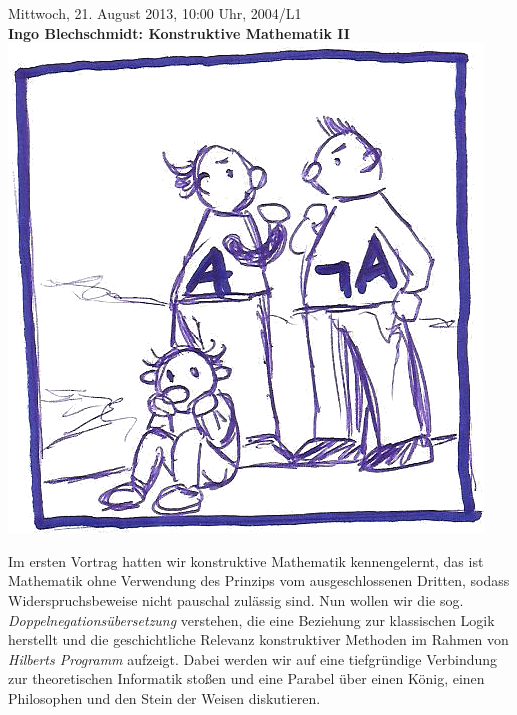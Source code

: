 \documentclass[a4paper,ngerman,landscape]{scrartcl}
\begin{document}
\begin{center}
  \Huge
  Mittwoch, 21. August 2013, 10:00 Uhr, 2004/L1 \\
  \textbf{Ingo Blechschmidt: Konstruktive Mathematik II}
  \vfill
  \includegraphics[scale=1.6]{lem}
  \vfill

  \Large
  \begin{minipage}{0.91\textwidth}
    \setlength\parskip{\medskipamount}
    Im ersten Vortrag hatten wir konstruktive Mathematik kennengelernt, das ist
    Mathematik ohne Verwendung des Prinzips vom ausgeschlossenen Dritten,
    sodass Widerspruchsbeweise nicht pauschal zulässig sind. Nun wollen wir
    die sog. \emph{Doppelnegationsübersetzung} verstehen, die eine Beziehung
    zur klassischen Logik herstellt und die geschichtliche Relevanz
    konstruktiver Methoden im Rahmen von \emph{Hilberts Programm} aufzeigt.
    Dabei werden wir auf eine tiefgründige Verbindung zur theoretischen
    Informatik stoßen und eine Parabel über einen König, einen Philosophen und den Stein der
    Weisen diskutieren.
  \end{minipage}
\end{center}

\newpage
\end{document}
